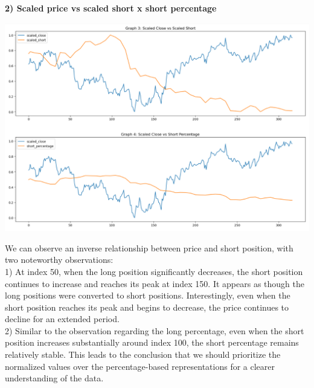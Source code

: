 \documentclass{article}
\begin{document}
\textbf{2) Scaled price vs scaled short x short percentage}
\begin{center}
    \includegraphics[scale=0.7]{p9.png}    
\end{center}
We can observe an inverse relationship between price and short position, with two noteworthy observations: \\
1) At index 50, when the long position significantly decreases, the short position continues to increase and reaches its peak at index 150. It appears as though the long positions were converted to short positions. Interestingly, even when the short position reaches its peak and begins to decrease, the price continues to decline for an extended period. \\ 
2) Similar to the observation regarding the long percentage, even when the short position increases substantially around index 100, the short percentage remains relatively stable. This leads to the conclusion that we should prioritize the normalized values over the percentage-based representations for a clearer understanding of the data.
\end{document}

